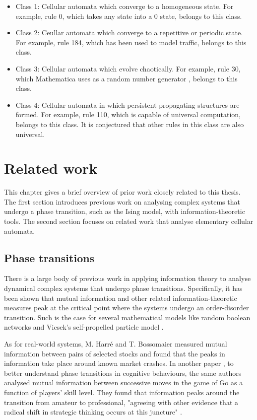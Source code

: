 \documentclass[12pt]{article}
\begin{document}
\begin{itemize}
\item Class 1: Cellular automata which converge to a homogeneous state. For example, rule 0, which takes any state into a 0 state, belongs to this class.
\item Class 2: Ceullar automata which converge to a repetitive or periodic state. For example, rule 184, which has been used to model traffic, belongs to this class.
\item Class 3: Cellular automata which evolve chaotically. For example, rule 30, which Mathematica uses as a random number generator \cite{NKS}, belongs to this class.
\item Class 4: Cellular automata in which persistent propagating structures are formed. For example, rule 110, which is capable of universal computation, belongs to this class. It is conjectured that other rules in this class are also universal. 
\end{itemize}

\newpage
\section{Related work} 

This chapter gives a brief overview of prior work closely related to this thesis. The first section introduces previous work on analysing complex systems that undergo a phase transition, such as the Ising model, with information-theoretic tools. The second section focuses on related work that analyse elementary cellular automata.    

\subsection{Phase transitions}

There is a large body of previous work in applying information theory to analyse dynamical complex systems that undergo phase transitions. Specifically, it has been shown that mutual information and other related information-theoretic measures peak at the critical point where the systems undergo an order-disorder transition. Such is the case for several mathematical models like random boolean networks \cite{lizier-rand-bool-nets} and Vicsek's self-propelled particle model \cite{mi-swarms}. 

As for real-world systems, M. Harré and T. Bossomaier \cite{mi-financial-markets} measured mutual information between pairs of selected stocks and found that the peaks in information take place around known market crashes. In another paper \cite{mi-go}, to better understand phase transitions in cognitive behaviours, the same authors analysed mutual information between successive moves in the game of Go as a function of players' skill level. They found that information peaks around the transition from amateur to professional, "agreeing with other evidence that a radical shift in strategic thinking occurs at this juncture" \cite{mi-social-systems}. 
\end{document}
